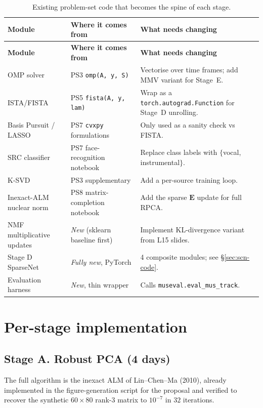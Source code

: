 \documentclass[10pt]{article}
\begin{document}
\begin{longtable}{@{}p{4.0cm} p{4.6cm} p{6.8cm}@{}}
\caption{Existing problem-set code that becomes the spine of each stage.}
\label{tab:reuse}\\
\toprule
\textbf{Module} & \textbf{Where it comes from} & \textbf{What needs changing} \\
\midrule
\endfirsthead
\toprule
\textbf{Module} & \textbf{Where it comes from} & \textbf{What needs changing} \\
\midrule
\endhead
OMP solver  &
PS3 \texttt{omp(A, y, S)} &
Vectorise over time frames; add MMV variant for Stage~E. \\
ISTA/FISTA  &
PS5 \texttt{fista(A, y, lam)} &
Wrap as a \texttt{torch.autograd.Function} for Stage~D unrolling. \\
Basis Pursuit / LASSO  &
PS7 \texttt{cvxpy} formulations &
Only used as a sanity check vs FISTA. \\
SRC classifier  &
PS7 face-recognition notebook &
Replace class labels with $\{$vocal, instrumental$\}$. \\
K-SVD &
PS3 supplementary &
Add a per-source training loop. \\
Inexact-ALM nuclear norm &
PS8 matrix-completion notebook &
Add the sparse $\bm{E}$ update for full RPCA. \\
NMF multiplicative updates &
\emph{New} (sklearn baseline first) &
Implement KL-divergence variant from L15 slides. \\
Stage D SparseNet &
\emph{Fully new}, PyTorch &
4 composite modules; see \S\ref{sec:scn-code}. \\
Evaluation harness &
\emph{New}, thin wrapper &
Calls \texttt{museval.eval\_mus\_track}. \\
\bottomrule
\end{longtable}

\section{Per-stage implementation}

\subsection{Stage A. Robust PCA (4 days)}
The full algorithm is the inexact ALM of Lin--Chen--Ma (2010), already
implemented in the figure-generation script for the proposal and verified
to recover the synthetic $60\!\times\!80$ rank-3 matrix to $10^{-7}$ in
$32$ iterations.
\end{document}
